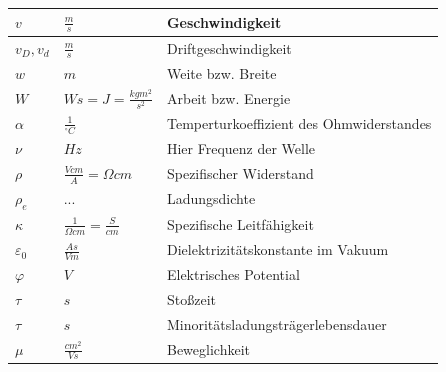 \documentclass[12pt,a4paper]{report}%
\numberwithin{equation}{section}
\numberwithin{equation}{subsection}
\begin{document}
\begin{longtable} {|p{2cm}|p{3cm}|p{8.4cm}|}
	$v$ & $\frac{m}{s}$ & Geschwindigkeit \\ \hline
	$v_D, v_d$ & $\frac{m}{s}$ & Driftgeschwindigkeit \\ \hline
	$w$ & $m$ & Weite bzw. Breite  \\ \hline
	$W$ & $Ws = J = \frac{kgm^2}{s^2}$ & Arbeit bzw. Energie \\ \hline
	
	$\alpha$ & $\frac{1}{^{\circ} C}$ & Temperturkoeffizient des Ohmwiderstandes \\ \hline
	$\nu$ & $Hz$ & Hier Frequenz der Welle \\ \hline
	$\rho$ & $\frac{V cm}{A} = \Omega  cm$ & Spezifischer Widerstand \\ \hline
	$\rho_e$ & ... & Ladungsdichte \\ \hline
	$\kappa$ & $\frac{1}{\Omega cm} = \frac{S}{cm}$ & Spezifische Leitfähigkeit \\ \hline
	$\varepsilon_0$ & $\frac{As}{Vm}$ & Dielektrizitätskonstante im Vakuum \\ \hline
	$\varphi$ & $V$ & Elektrisches Potential \\ \hline
	$\tau$ & $s$ & Stoßzeit \\ \hline
	$\tau$ & $s$ & Minoritätsladungsträgerlebensdauer \\ \hline
	$\mu$ & $\frac{cm^2}{Vs}$ & Beweglichkeit \\ \hline
	\end{longtable}
	\renewcommand{\arraystretch}{1}
	
\end{document}
